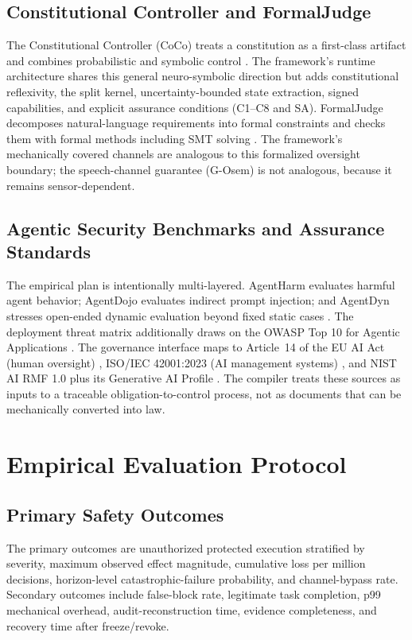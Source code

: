\documentclass[11pt]{article}
\def\textsuperscript#1{#1}%
\newcommand{\Gsem}{G-O\textsuperscript{sem}}
\begin{document}
\subsection{Constitutional Controller and FormalJudge}
The Constitutional Controller (CoCo) treats a constitution as a first-class artifact and combines probabilistic and symbolic control \cite{coco}. The framework's runtime architecture shares this general neuro-symbolic direction but adds constitutional reflexivity, the split kernel, uncertainty-bounded state extraction, signed capabilities, and explicit assurance conditions (C1--C8 and SA). FormalJudge decomposes natural-language requirements into formal constraints and checks them with formal methods including SMT solving \cite{formaljudge}. The framework's mechanically covered channels are analogous to this formalized oversight boundary; the speech-channel guarantee (\Gsem{}) is not analogous, because it remains sensor-dependent.

\subsection{Agentic Security Benchmarks and Assurance Standards}
The empirical plan is intentionally multi-layered. AgentHarm evaluates harmful agent behavior; AgentDojo evaluates indirect prompt injection; and AgentDyn stresses open-ended dynamic evaluation beyond fixed static cases \cite{agentharm,agentdojo,agentdyn}. The deployment threat matrix additionally draws on the OWASP Top 10 for Agentic Applications \cite{owasp-agentic}. The governance interface maps to Article~14 of the EU AI Act (human oversight) \cite{euaiact}, ISO/IEC 42001:2023 (AI management systems) \cite{iso42001}, and NIST AI RMF 1.0 plus its Generative AI Profile \cite{nistairmf,nistgenai}. The compiler treats these sources as inputs to a traceable obligation-to-control process, not as documents that can be mechanically converted into law.

\section{Empirical Evaluation Protocol}\label{app:evaluation}
\subsection{Primary Safety Outcomes}
The primary outcomes are unauthorized protected execution stratified by severity, maximum observed effect magnitude, cumulative loss per million decisions, horizon-level catastrophic-failure probability, and channel-bypass rate. Secondary outcomes include false-block rate, legitimate task completion, p99 mechanical overhead, audit-reconstruction time, evidence completeness, and recovery time after freeze/revoke.
\end{document}
